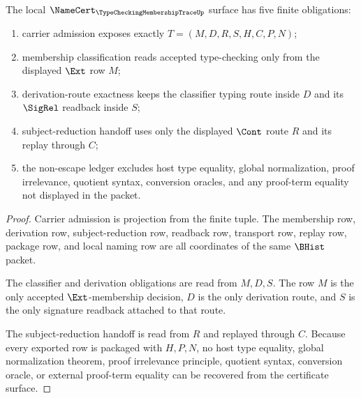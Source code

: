 \begin{theorem}
\label{thm:typechecking-membership-trace-namecert-obligations}
The local $\NameCert_{\TypeCheckingMembershipTraceUp}$ surface has five finite obligations:
\begin{enumerate}
\item carrier admission exposes exactly $T=(M,D,R,S,H,C,P,N)$;
\item membership classification reads accepted type-checking only from the displayed $\Ext$ row $M$;
\item derivation-route exactness keeps the classifier typing route inside $D$ and its $\SigRel$ readback inside $S$;
\item subject-reduction handoff uses only the displayed $\Cont$ route $R$ and its replay through $C$;
\item the non-escape ledger excludes host type equality, global normalization, proof irrelevance, quotient syntax, conversion oracles, and any proof-term equality not displayed in the packet.
\end{enumerate}
\end{theorem}
\begin{proof}
Carrier admission is projection from the finite tuple. The membership row, derivation row, subject-reduction row, readback row, transport row, replay row, package row, and local naming row are all coordinates of the same $\BHist$ packet.

The classifier and derivation obligations are read from $M,D,S$. The row $M$ is the only accepted $\Ext$-membership decision, $D$ is the only derivation route, and $S$ is the only signature readback attached to that route.

The subject-reduction handoff is read from $R$ and replayed through $C$. Because every exported row is packaged with $H,P,N$, no host type equality, global normalization theorem, proof irrelevance principle, quotient syntax, conversion oracle, or external proof-term equality can be recovered from the certificate surface.
\end{proof}

